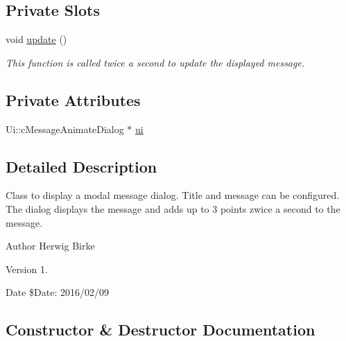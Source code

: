 \subsection*{Private Slots}
\begin{DoxyCompactItemize}
\item 
void \hyperlink{classc_message_animate_dialog_a09ea517229b2b01be6dc407911628441}{update} ()
\begin{DoxyCompactList}\small\item\em This function is called twice a second to update the displayed message. \end{DoxyCompactList}\end{DoxyCompactItemize}
\subsection*{Private Attributes}
\begin{DoxyCompactItemize}
\item 
Ui\+::c\+Message\+Animate\+Dialog $\ast$ \hyperlink{classc_message_animate_dialog_a9975d744633e4f1eb1604128cbfd7b50}{ui}
\end{DoxyCompactItemize}


\subsection{Detailed Description}
Class to display a modal message dialog. Title and message can be configured. The dialog displays the message and adds up to 3 points zwice a second to the message.

\begin{DoxyAuthor}{Author}
Herwig Birke
\end{DoxyAuthor}
\begin{DoxyVersion}{Version}
1.
\end{DoxyVersion}
\begin{DoxyDate}{Date}
\$\+Date\+: 2016/02/09 
\end{DoxyDate}


\subsection{Constructor \& Destructor Documentation}
